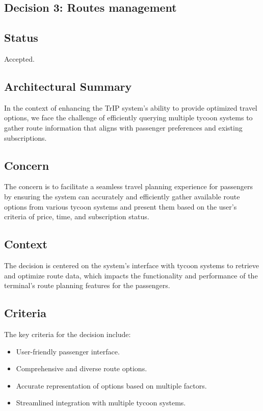 \subsection{Decision 3: Routes management}

\subsection*{Status}
Accepted.

\subsection*{Architectural Summary}
In the context of enhancing the TrIP system's ability to provide optimized travel options, we face the challenge of efficiently querying multiple tycoon systems to gather route information that aligns with passenger preferences and existing subscriptions.

\subsection*{Concern}
The concern is to facilitate a seamless travel planning experience for passengers by ensuring the system can accurately and efficiently gather available route options from various tycoon systems and present them based on the user's criteria of price, time, and subscription status.

\subsection*{Context}
The decision is centered on the system's interface with tycoon systems to retrieve and optimize route data, which impacts the functionality and performance of the terminal's route planning features for the passengers.

\subsection*{Criteria}
The key criteria for the decision include:
\begin{itemize}
    \item User-friendly passenger interface.
    \item Comprehensive and diverse route options.
    \item Accurate representation of options based on multiple factors.
    \item Streamlined integration with multiple tycoon systems.
\end{itemize}

